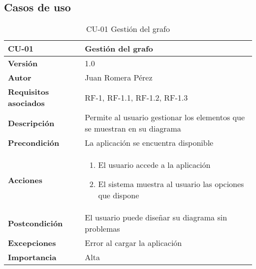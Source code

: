 \subsection{Casos de uso}
\begin{table}[p]
    \centering
    \begin{tabularx}{\linewidth}{ p{} p{}}
		\toprule
		\textbf{CU-01}    & \textbf{Gestión del grafo}\\
		\toprule
		\textbf{Versión}              & 1.0    \\
		\textbf{Autor}                & Juan Romera Pérez \\
		\textbf{Requisitos asociados} & RF-1, RF-1.1, RF-1.2, RF-1.3 \\
		\textbf{Descripción}          & Permite al usuario gestionar los elementos que se muestran en su diagrama \\
		\textbf{Precondición}         & La aplicación se encuentra disponible \\
		\textbf{Acciones}             &
		\begin{enumerate}
			\def\labelenumi{\arabic{enumi}.}
			\tightlist
			\item El usuario accede a la aplicación
			\item El sistema muestra al usuario las opciones que dispone
		\end{enumerate}\\
		\textbf{Postcondición}        & El usuario puede diseñar su diagrama sin problemas \\
		\textbf{Excepciones}          & Error al cargar la aplicación \\
		\textbf{Importancia}          & Alta \\
		\bottomrule
    \end{tabularx}
    \caption{CU-01 Gestión del grafo}
\end{table}

